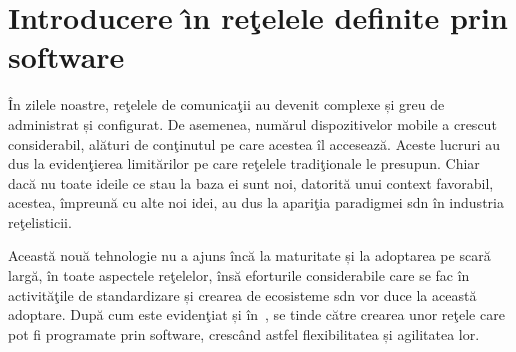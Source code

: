 \chapter{Introducere \^{\i}n reţelele definite prin software\label{ch:introducere_sdn}}

În zilele noastre, reţelele de comunicaţii au devenit complexe și greu de administrat și configurat. De asemenea, numărul dispozitivelor mobile a crescut considerabil, alături de conţinutul pe care acestea îl accesează. Aceste lucruri au dus la evidenţierea limitărilor pe care reţelele tradiţionale le presupun. Chiar dacă nu toate ideile ce stau la baza ei sunt noi, datorită unui context favorabil, acestea, împreună cu alte noi idei, au dus la apariţia paradigmei \gls{sdn} în industria reţelisticii.

Această nouă tehnologie nu a ajuns încă la maturitate și la adoptarea pe scară largă, în toate aspectele reţelelor, însă eforturile considerabile care se fac în activităţile de standardizare și crearea de ecosisteme \gls{sdn} vor duce la această adoptare. După cum este evidenţiat și în~\cite{nadeau2013sdn}, se tinde către crearea unor reţele care pot fi programate prin software, crescând astfel flexibilitatea și agilitatea lor.




